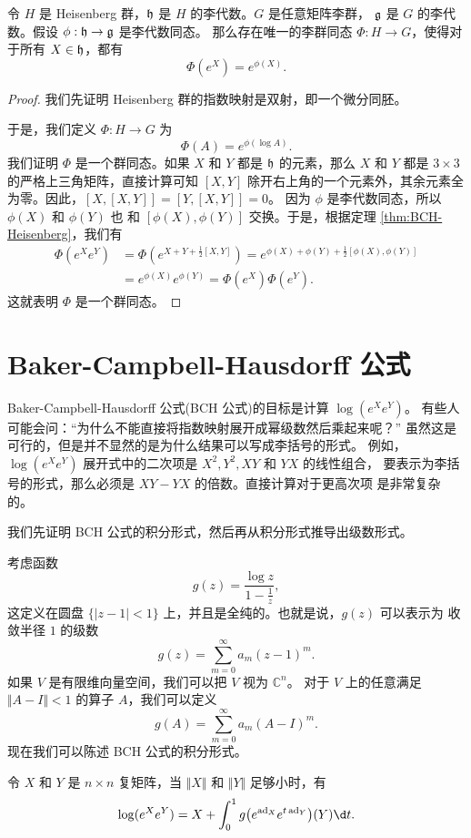 \begin{theorem}
  令 $H$ 是 Heisenberg 群，$\mathfrak{h}$ 是 $H$ 的李代数。$G$ 是任意矩阵李群，
  $\mathfrak{g}$ 是 $G$ 的李代数。假设 $\phi:\mathfrak{h}\to\mathfrak{g}$ 是李代数同态。
  那么存在唯一的李群同态 $\Phi:H\to G$，使得对于所有 $X\in\mathfrak{h}$，都有
  \[
    \Phi(e^X)=e^{\phi(X)}.
  \]
\end{theorem}
\begin{proof}
  我们先证明 Heisenberg 群的指数映射是双射，即一个微分同胚。

  于是，我们定义 $\Phi:H\to G$ 为
  \[
    \Phi(A)=e^{\phi(\log A)}.
  \]
  我们证明 $\Phi$ 是一个群同态。如果 $X$ 和 $Y$ 都是 $\mathfrak{h}$ 的元素，那么
  $X$ 和 $Y$ 都是 $3\times 3$ 的严格上三角矩阵，直接计算可知
  $[X,Y]$ 除开右上角的一个元素外，其余元素全为零。因此，$[X,[X,Y]]=[Y,[X,Y]]=0$。
  因为 $\phi$ 是李代数同态，所以 $\phi(X)$ 和 $\phi(Y)$ 也
  和 $[\phi(X),\phi(Y)]$ 交换。于是，根据定理 \ref{thm:BCH-Heisenberg}，我们有
  \begin{align*}
    \Phi(e^Xe^Y)&=\Phi\left(e^{X+Y+\frac{1}{2}[X,Y]}\right)=
    e^{\phi(X)+\phi(Y)+\frac{1}{2}[\phi(X),\phi(Y)]} \\
    &=e^{\phi(X)}e^{\phi(Y)}=\Phi(e^X)\Phi(e^Y).
  \end{align*}
  这就表明 $\Phi$ 是一个群同态。
\end{proof}

\section{Baker-Campbell-Hausdorff 公式}

Baker-Campbell-Hausdorff 公式(BCH 公式)的目标是计算 $\log(e^Xe^Y)$。
有些人可能会问：“为什么不能直接将指数映射展开成幂级数然后乘起来呢？”
虽然这是可行的，但是并不显然的是为什么结果可以写成李括号的形式。
例如，$\log(e^Xe^Y)$ 展开式中的二次项是 $X^2,Y^2,XY$ 和 $YX$ 的线性组合，
要表示为李括号的形式，那么必须是 $XY-YX$ 的倍数。直接计算对于更高次项
是非常复杂的。

我们先证明 BCH 公式的积分形式，然后再从积分形式推导出级数形式。

考虑函数 
\[
  g(z)=\frac{\log z}{1-\frac{1}{z}},
\]
这定义在圆盘 $\{|z-1|<1\}$ 上，并且是全纯的。也就是说，$g(z)$ 可以表示为
收敛半径 $1$ 的级数
\[
  g(z)=\sum_{m=0}^\infty a_m(z-1)^m.
\]
如果 $V$ 是有限维向量空间，我们可以把 $V$ 视为 $\mathbb{C}^n$。
对于 $V$ 上的任意满足 $\Vert A-I\Vert<1$ 的算子 $A$，我们可以定义
\[
  g(A)=\sum_{m=0}^\infty a_m(A-I)^m.
\]
现在我们可以陈述 BCH 公式的积分形式。

\begin{theorem}
  令 $X$ 和 $Y$ 是 $n\times n$ 复矩阵，当 $\Vert X\Vert$ 和 $\Vert Y\Vert$
  足够小时，有
  \begin{equation}\label{eq:BCH-integral}
    \log(e^Xe^Y)=X+\int_0^1 g\bigl(e^{\ad_X}e^{t\ad_Y}\bigr)(Y)\d t.
  \end{equation}
\end{theorem}


